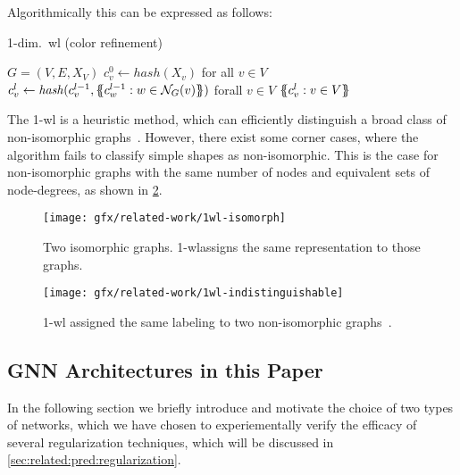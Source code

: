 Algorithmically this can be expressed as follows:
\begin{algorithm}[H]
    \caption{1-dim.\ \ac{wl} (color refinement)}
    \begin{algorithmic}[1]
        \Require $G = (V,E,X_{V})$
        \State $c_{v}^{0} \gets \mathit{hash}(X_{v})$ for all $v \in V$
        \Repeat
        \State $c_{v}^{l} \gets \mathit{hash}(c_{v}^{l-1}, \ldblbrace c_{w}^{l-1}: w \in \mathcal N_{G}(v)\rdblbrace)$ forall $v \in V$
        \State \Return $\ldblbrace c_{v}^l : v \in V \rdblbrace$
    \end{algorithmic}
\end{algorithm}

The 1-\ac{wl} is a heuristic method, which can efficiently distinguish a broad class of non-isomorphic
graphs~\cite{Babai1979}.
However, there exist some corner cases, where the algorithm fails to classify
simple shapes as non-isomorphic. This is the case for non-isomorphic graphs with the same number of nodes and equivalent sets of node-degrees, as shown in \cref*{fig:related:1-wl-indistinguishable}.

\begin{figure}[H]
    \centering
    \texttt{[image: gfx/related-work/1wl-isomorph]}
    \caption{Two isomorphic graphs. 1-\ac{wl}assigns the same representation to those graphs.}\label{fig:related:1-wl-indistinguishable}
\end{figure}

\begin{figure}[H]
    \centering
    \texttt{[image: gfx/related-work/1wl-indistinguishable]}
    \caption{1-\ac{wl} assigned the same labeling to two non-isomorphic graphs~\cite{Liu2022}.}\label{fig:related:1-wl-indistinguishable}
\end{figure}


\subsection{GNN Architectures in this Paper}
\label{sec:related:architectures}


In the following section we briefly introduce and
motivate the choice of two types of networks, which we have
chosen to experiementally verify the efficacy of several regularization techniques, which will be discussed in \cref{sec:related:pred:regularization}.

